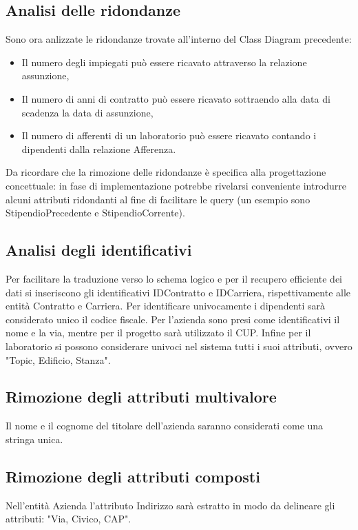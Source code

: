 \subsection{Analisi delle ridondanze}
Sono ora anlizzate le ridondanze trovate all'interno del Class Diagram precedente:
\begin{itemize}
    \item Il numero degli impiegati può essere ricavato attraverso la relazione assunzione,
    \item Il numero di anni di contratto può essere ricavato sottraendo alla data di scadenza la data di assunzione,
    \item Il numero di afferenti di un laboratorio può essere ricavato contando i dipendenti dalla relazione Afferenza.
\end{itemize}
Da ricordare che la rimozione delle ridondanze è specifica alla progettazione concettuale: in fase di implementazione potrebbe rivelarsi conveniente introdurre alcuni attributi ridondanti al fine di facilitare le query (un esempio sono StipendioPrecedente e StipendioCorrente).

\subsection{Analisi degli identificativi}
Per facilitare la traduzione verso lo schema logico e per il recupero efficiente dei dati si inseriscono gli identificativi IDContratto e IDCarriera, rispettivamente alle entità Contratto e Carriera.
Per identificare univocamente i dipendenti sarà considerato unico il codice fiscale. Per l'azienda sono presi come identificativi il nome e la via, mentre per il progetto sarà utilizzato il CUP. Infine per il laboratorio si possono considerare univoci nel sistema tutti i suoi attributi, ovvero "Topic, Edificio, Stanza".


\subsection{Rimozione degli attributi multivalore}
Il nome e il cognome del titolare dell'azienda saranno considerati come una stringa unica.

\subsection{Rimozione degli attributi composti}
Nell'entità Azienda l'attributo Indirizzo sarà estratto in modo da delineare gli attributi: "Via, Civico, CAP".

